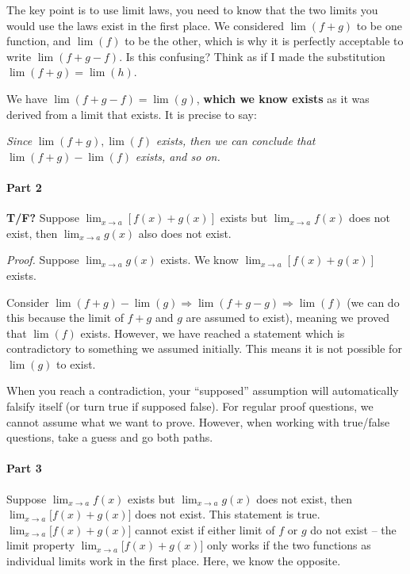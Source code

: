 \documentclass[
]{article}
\begin{document}
The key point is to use limit laws, you need to know that the two limits
you would use the laws exist in the first place. We considered
$\lim(f + g)$ to be one function, and $\lim(f)$ to be the other,
which is why it is perfectly acceptable to write $\lim(f + g - f)$. Is
this confusing? Think as if I made the substitution
$\lim(f + g) = \lim(h)$.

We have $\lim(f + g - f) = \lim(g)$, \textbf{which we know exists} as
it was derived from a limit that exists. It is precise to say:

\emph{Since} $\lim(f + g),\lim(f)$ \emph{exists, then we can conclude
that} $\lim(f + g) - \lim(f)$ \emph{exists, and so on.}


\paragraph{Part 2}

\textbf{T/F?} Suppose
$\lim_{x \rightarrow a}\left\lbrack f(x) + g(x) \right\rbrack$ exists
but $\lim_{x \rightarrow a}{f(x)}$ does not exist, then
$\lim_{x \rightarrow a}{g(x)}$ also does not exist.

\emph{Proof.} Suppose $\lim_{x \rightarrow a}{g(x)}$ exists. We know
$\lim_{x \rightarrow a}\left\lbrack f(x) + g(x) \right\rbrack$ exists.

Consider
$\lim(f + g) - \lim(g) \Rightarrow \lim(f + g - g) \Rightarrow \lim(f)$
(we can do this because the limit of $f + g$ and $g$ are assumed to
exist), meaning we proved that $\lim(f)$ exists. However, we have
reached a statement which is contradictory to something we assumed
initially. This means it is not possible for $\lim(g)$ to exist.

When you reach a contradiction, your ``supposed'' assumption will
automatically falsify itself (or turn true if supposed false). For
regular proof questions, we cannot assume what we want to prove.
However, when working with true/false questions, take a guess and go
both paths.


\paragraph{Part 3}

Suppose $\lim_{x \rightarrow a}{f(x)}$ exists but
$\lim_{x \rightarrow a}{g(x)}$ does not exist, then
$\lim_{x \rightarrow a}{\lbrack f(x) + g(x)\rbrack}$ does not exist.
This statement is true.
$\lim_{x \rightarrow a}{\lbrack f(x) + g(x)\rbrack}$ cannot exist if
either limit of $f$ or $g$ do not exist -- the limit property
$\lim_{x \rightarrow a}{\lbrack f(x) + g(x)\rbrack}$ only works if the
two functions as individual limits work in the first place. Here, we
know the opposite.
\end{document}
